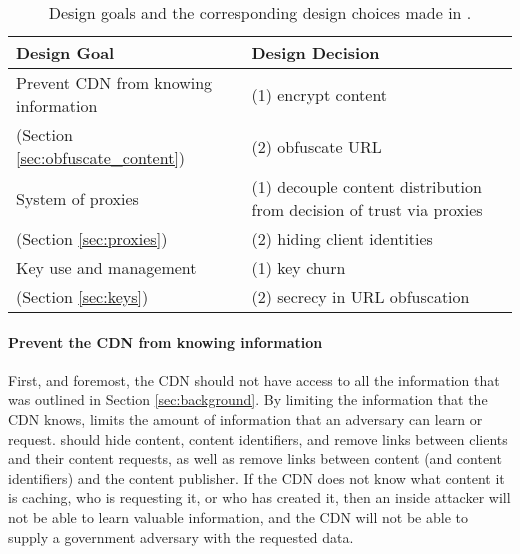 \begin{table*}[t!]
\centering
\begin{tabular}{| l | l |} 
 \hline
 {\bf Design Goal} & {\bf Design Decision} \\ 
 \hline\hline
 Prevent CDN from knowing information & (1) encrypt content   \\ 
  (Section \ref{sec:obfuscate_content})                          & (2) obfuscate URL \\ \hline
 System of proxies & (1) decouple content distribution from decision of trust via proxies  \\ 
  (Section \ref{sec:proxies})  & (2) hiding client identities \\ \hline
 Key use and management & (1) key churn \\ 
   (Section \ref{sec:keys})                     & (2) secrecy in URL obfuscation \\ 
 \hline
\end{tabular}
\caption{Design goals and the corresponding design choices made in \system{}.}
\label{tab:design_goals}
\end{table*}

\paragraph{Prevent the CDN from knowing information} First, and foremost, the CDN 
should not have access to all the information that was outlined 
in Section \ref{sec:background}.  By limiting the information that the CDN knows, \system{} limits 
the amount of information that an adversary can learn or request.  \system{} should hide 
content, content identifiers, and remove links between clients and their content requests, as well 
as remove links between content (and content identifiers) and the content publisher.  If the CDN 
does not know what content it is caching, who is requesting it, or who has created it, then an 
inside attacker will not be able to learn valuable information, and the CDN will not be able to supply 
a government adversary with the requested data.

